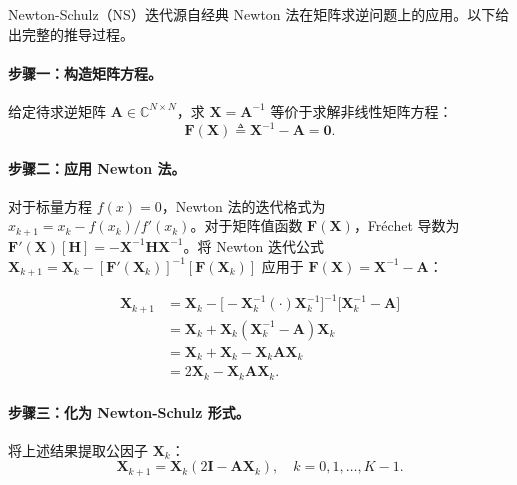 \documentclass{CjC}
\begin{document}
    Newton-Schulz（NS）迭代源自经典 Newton
    法在矩阵求逆问题上的应用。以下给出完整的推导过程。

    \paragraph{步骤一：构造矩阵方程。}
    给定待求逆矩阵 $\bm{A}\in\mathbb{C}^{N\times N}$，求 $\bm{X}=\bm{A}^{-1}$ 等价于求解非线性矩阵方程：
    \begin{equation}
        \bm{F}(\bm{X}) \triangleq \bm{X}^{-1}- \bm{A}= \bm{0}.
    \end{equation}

    \paragraph{步骤二：应用 Newton 法。}
    对于标量方程 $f(x)=0$，Newton 法的迭代格式为
    $x_{k+1}=x_{k}- f(x_{k})/f'(x_{k})$。对于矩阵值函数 $\bm{F}(\bm{X})$，Fréchet
    导数为 $\bm{F}'(\bm{X})[\bm{H}] = -\bm{X}^{-1}\bm{H}\bm{X}^{-1}$。将 Newton 迭代公式
    $\bm{X}_{k+1}= \bm{X}_{k}- [\bm{F}'(\bm{X}_{k})]^{-1}[\bm{F}(\bm{X}_{k})]$ 应用于
    $\bm{F}(\bm{X})=\bm{X}^{-1}-\bm{A}$：

    \begin{equation}
        \begin{aligned}
            \bm{X}_{k+1} & = \bm{X}_{k}- \big[-\bm{X}_{k}^{-1}(\cdot)\bm{X}_{k}^{-1}\big]^{-1}\big[\bm{X}_{k}^{-1}- \bm{A}\big] \\
                         & = \bm{X}_{k}+ \bm{X}_{k}(\bm{X}_{k}^{-1}- \bm{A})\bm{X}_{k}                                          \\
                         & = \bm{X}_{k}+ \bm{X}_{k}- \bm{X}_{k}\bm{A}\bm{X}_{k}                                                 \\
                         & = 2\bm{X}_{k}- \bm{X}_{k}\bm{A}\bm{X}_{k}.
        \end{aligned}
    \end{equation}

    \paragraph{步骤三：化为 Newton-Schulz 形式。}
    将上述结果提取公因子 $\bm{X}_{k}$：
    \begin{equation}
        \boxed{\bm{X}_{k+1} = \bm{X}_k\left(2\bm{I} - \bm{A}\bm{X}_k\right)},\quad
        k = 0, 1, \dots, K-1.
    \end{equation}
\end{document}
